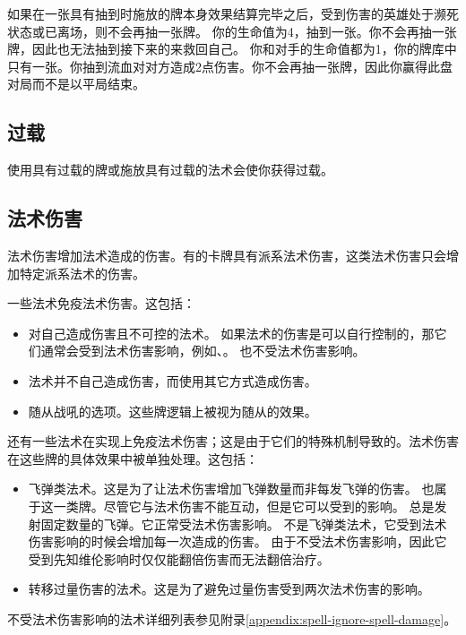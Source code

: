 如果在一张具有抽到时施放的牌本身效果结算完毕之后，受到伤害的英雄处于濒死状态或已离场，则不会再抽一张牌。
\example 你的生命值为4，抽到一张。你不会再抽一张牌，因此也无法抽到接下来的来救回自己。
\example 你和对手的生命值都为1，你的牌库中只有一张。你抽到流血对对方造成2点伤害。你不会再抽一张牌，因此你赢得此盘对局而不是以平局结束。

\subsection{过载}
\label{overload}

使用具有过载的牌或施放具有过载的法术会使你获得过载。

\subsection{法术伤害}
\label{spell-damage}

法术伤害增加法术造成的伤害。有的卡牌具有派系法术伤害，这类法术伤害只会增加特定派系法术的伤害。

一些法术免疫法术伤害。这包括：
\begin{itemize}
    \item 对自己造成伤害且不可控的法术。
        \notice 如果法术的伤害是可以自行控制的，那它们通常会受到法术伤害影响，例如、。
        \exception {}也不受法术伤害影响。
    \item 法术并不自己造成伤害，而使用其它方式造成伤害。
    \item 随从战吼的选项。这些牌逻辑上被视为随从的效果。
\end{itemize}

还有一些法术在实现上免疫法术伤害；这是由于它们的特殊机制导致的。法术伤害在这些牌的具体效果中被单独处理。这包括：
\begin{itemize}
    \item 飞弹类法术。这是为了让法术伤害增加飞弹数量而非每发飞弹的伤害。
        \notice {}也属于这一类牌。尽管它与法术伤害不能互动，但是它可以受到的影响。
        \exception {}总是发射固定数量的飞弹。它正常受法术伤害影响。
        \exception {}不是飞弹类法术，它受到法术伤害影响的时候会增加每一次造成的伤害。
        \notice 由于不受法术伤害影响，因此它受到先知维伦影响时仅仅能翻倍伤害而无法翻倍治疗。
    \item 转移过量伤害的法术。这是为了避免过量伤害受到两次法术伤害的影响。
\end{itemize}
不受法术伤害影响的法术详细列表参见附录\ref{appendix:spell-ignore-spell-damage}。

